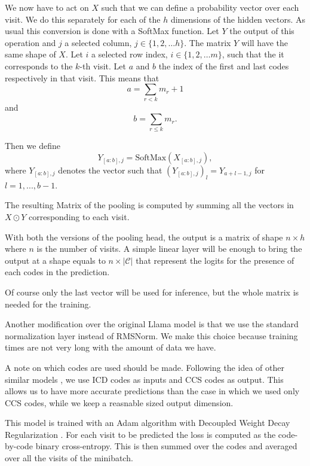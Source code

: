 \documentclass[]{marticle}
\newcommand{\codes}{\mathcal{C}}
\begin{document}
We now have to act on $X$ such that we can define a probability vector over each visit. We do this
separately for each of the $h$ dimensions of the hidden vectors. As usual this conversion is done
with a SoftMax function. Let $Y$ the output of this operation and $j$ a selected column,
$j\in\{1,2,\dots h\}$. The matrix $Y$ will have the same shape of $X$. Let $i$ a selected row index,
$i\in \{1,2,\dots m\}$, such that the it corresponds to the $k$-th visit. Let $a$ and $b$ the index
of the first and last codes respectively in that visit. This means that 
\begin{equation*}
    a = \sum_{r < k} m_r + 1
\end{equation*}
and 
\begin{equation*}
    b = \sum_{r \leq k} m_r.
\end{equation*}

Then we define
\begin{equation*}
   Y_{[a:b], j} = \text{SoftMax}(X_{[a:b], j}),
\end{equation*}
where $Y_{[a:b], j}$ denotes the vector such that $(Y_{[a:b], j})_l = Y_{a+l-1, j}$ for ${{l=1,..., b-1}}$.

The resulting Matrix of the pooling is computed by summing all the vectors in $X\odot Y$
corresponding to each visit.

With both the versions of the pooling head, the output is a matrix of shape $n \times h$ where $n$
is the number of visits. A simple linear layer will be enough to bring the output at a shape equals
to $n \times |\codes|$ that represent the logits for the presence of each codes in the prediction.

Of course only the last vector will be used for inference, but the whole matrix is needed for the
training.

Another modification over the original Llama model is that we use the standard normalization layer
instead of RMSNorm. We make this choice because training times are not very long with the amount of
data we have.

A note on which codes are used should be made. Following the idea of other similar models
\cite{setor-paper}, we use ICD codes as inputs and CCS codes as output. This allows us to have more
accurate predictions than the case in which we used only CCS codes, while we keep a reasnable sized
output dimension.

This model is trained with an Adam algorithm with Decoupled Weight Decay Regularization
\cite{paper-adamw}. For each visit to be predicted the loss is computed as the code-by-code binary
cross-entropy. This is then summed over the codes and averaged over all the visits of the minibatch.
\end{document}
